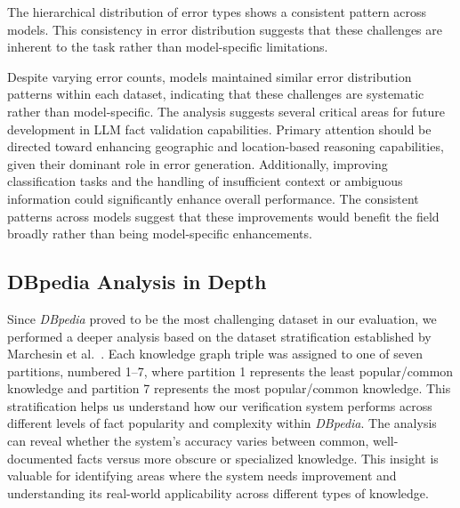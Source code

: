 The hierarchical distribution of error types shows a consistent pattern across models.
This consistency in error distribution suggests that these challenges are inherent to the task rather than model-specific limitations.

Despite varying error counts, models maintained similar error distribution patterns within each dataset, indicating that these challenges are systematic rather than model-specific.
The analysis suggests several critical areas for future development in LLM fact validation capabilities.
Primary attention should be directed toward enhancing geographic and location-based reasoning capabilities, given their dominant role in error generation.
Additionally, improving classification tasks and the handling of insufficient context or ambiguous information could significantly enhance overall performance.
The consistent patterns across models suggest that these improvements would benefit the field broadly rather than being model-specific enhancements.

\subsection{DBpedia Analysis in Depth}\label{subsec:db}
Since \textit{DBpedia} proved to be the most challenging dataset in our evaluation, we performed a deeper analysis based on the dataset stratification established by Marchesin et al.~\cite{Marchesin_Silvello_Alonso_2024}.
Each knowledge graph triple was assigned to one of seven partitions, numbered 1--7, where partition 1 represents the least popular/common knowledge and partition 7 represents the most popular/common knowledge.
This stratification helps us understand how our verification system performs across different levels of fact popularity and complexity within \textit{DBpedia}.
The analysis can reveal whether the system's accuracy varies between common, well-documented facts versus more obscure or specialized knowledge.
This insight is valuable for identifying areas where the system needs improvement and understanding its real-world applicability across different types of knowledge.


